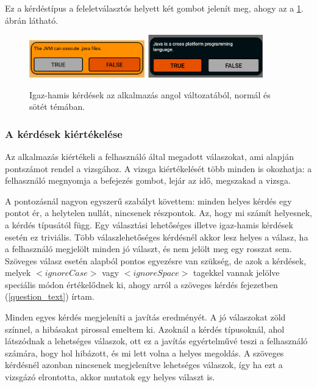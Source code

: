 \documentclass[12pt,a4paper]{article}
\begin{document}
	Ez a kérdéstípus a feleletválasztós helyett két gombot jelenít meg, ahogy az a \ref{question_true_false_figure}. ábrán látható.
	
	\begin{figure}[h!]
		\centering
		\includegraphics[width=5cm]{question_true_false}
		\includegraphics[width=5cm]{question_true_false_dark}
		\caption{Igaz-hamis kérdések az alkalmazás angol változatából, normál és sötét témában.}
		\label{question_true_false_figure}
	\end{figure}
	
	\subsubsection{A kérdések kiértékelése}
	
	Az alkalmazás kiértékeli a felhasználó által megadott válaszokat, ami alapján pontszámot rendel a vizsgához. A vizsga kiértékelését több minden is okozhatja: a felhasználó megnyomja a befejezés gombot, lejár az idő, megszakad a vizsga.
	
	A pontozásnál nagyon egyszerű szabályt követtem: minden helyes kérdés egy pontot ér, a helytelen nullát, nincsenek részpontok. Az, hogy mi számít helyesnek, a kérdés típusától függ. Egy választási lehetőséges illetve igaz-hamis kérdések esetén ez triviális. Több válaszlehetőséges kérdésnél akkor lesz helyes a válasz, ha a felhasználó megjelölt minden jó választ, és nem jelölt meg egy rosszat sem. Szöveges válasz esetén alapból pontos egyezésre van szükség, de azok a kérdések, melyek $<ignoreCase>$ vagy $<ignoreSpace>$ tagekkel vannak jelölve speciális módon értékelődnek ki, ahogy arról a szöveges kérdés fejezetben (\ref{question_text}) írtam.
	
	Minden egyes kérdés megjeleníti a javítás eredményét. A jó válaszokat zöld színnel, a hibásakat pirossal emeltem ki. Azoknál a kérdés típusoknál, ahol látszódnak a lehetséges válaszok, ott ez a javítás egyértelművé teszi a felhasználó számára, hogy hol hibázott, és mi lett volna a helyes megoldás. A szöveges kérdésnél azonban nincsenek megjelenítve lehetséges válaszok, így ha ezt a vizsgázó elrontotta, akkor mutatok egy helyes választ is.
	
\end{document}
